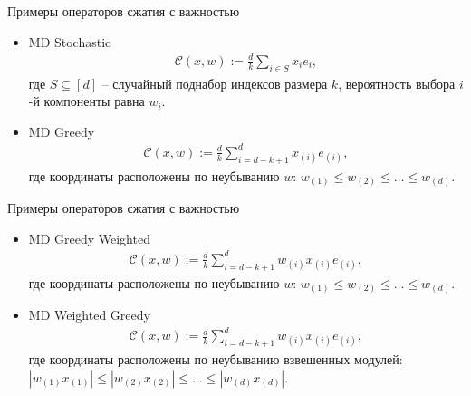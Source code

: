 \documentclass{beamer}
\begin{document}
\begin{frame}{Примеры операторов сжатия с важностью}
    \begin{itemize}
     \item MD Stochastic
     \begin{align*}
      \mathcal{C}(x, w) := \frac{d}{k} \sum_{i \in S} x_i e_i,
     \end{align*}
     где $S \subseteq [d]$ -- случайный поднабор индексов размера $k$, вероятность выбора $i$-й компоненты равна $w_i$.
     \item MD Greedy
     \begin{align*}
      \mathcal{C}(x, w) := \frac{d}{k} \sum_{i = d - k + 1}^d x_{(i)} e_{(i)},
     \end{align*}
     где координаты расположены по неубыванию $w$: $w_{(1)} \leq w_{(2)} \leq \dots \leq w_{(d)}$.
    \end{itemize}
\end{frame}

\begin{frame}{Примеры операторов сжатия с важностью}
    \begin{itemize}
    \item MD Greedy Weighted
     \begin{align*}
      \mathcal{C}(x, w) := \frac{d}{k} \sum_{i = d - k + 1}^d w_{(i)} x_{(i)} e_{(i)},
     \end{align*}
     где координаты расположены по неубыванию $w$: $w_{(1)} \leq w_{(2)} \leq \dots \leq w_{(d)}$.

    \item MD Weighted Greedy
     \begin{align*}
      \mathcal{C}(x, w) := \frac{d}{k} \sum_{i = d - k + 1}^d w_{(i)} x_{(i)} e_{(i)},
     \end{align*}
     где координаты расположены по неубыванию взвешенных модулей: $|w_{(1)} x_{(1)}| \leq |w_{(2)} x_{(2)}| \leq \dots \leq |w_{(d)} x_{(d)}|$.
    \end{itemize}

\end{frame}

\end{document}
